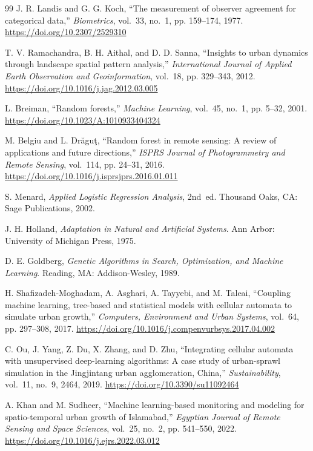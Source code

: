 \documentclass[12pt,a4paper]{article}
\begin{document}
\begin{thebibliography}{99}
J. R. Landis and G. G. Koch, ``The measurement of observer agreement for categorical data,'' \textit{Biometrics}, vol.~33, no.~1, pp. 159--174, 1977.
\url{https://doi.org/10.2307/2529310}

T. V. Ramachandra, B. H. Aithal, and D. D. Sanna, ``Insights to urban dynamics through landscape spatial pattern analysis,'' \textit{International Journal of Applied Earth Observation and Geoinformation}, vol.~18, pp. 329--343, 2012.
\url{https://doi.org/10.1016/j.jag.2012.03.005}

L. Breiman, ``Random forests,'' \textit{Machine Learning}, vol.~45, no.~1, pp. 5--32, 2001.
\url{https://doi.org/10.1023/A:1010933404324}

M. Belgiu and L. Dr\u{a}gu\c{t}, ``Random forest in remote sensing: A review of applications and future directions,'' \textit{ISPRS Journal of Photogrammetry and Remote Sensing}, vol.~114, pp. 24--31, 2016.
\url{https://doi.org/10.1016/j.isprsjprs.2016.01.011}

S. Menard, \textit{Applied Logistic Regression Analysis}, 2nd~ed. Thousand Oaks, CA: Sage Publications, 2002.

J. H. Holland, \textit{Adaptation in Natural and Artificial Systems}. Ann Arbor: University of Michigan Press, 1975.

D. E. Goldberg, \textit{Genetic Algorithms in Search, Optimization, and Machine Learning}. Reading, MA: Addison-Wesley, 1989.

H. Shafizadeh-Moghadam, A. Asghari, A. Tayyebi, and M. Taleai, ``Coupling machine learning, tree-based and statistical models with cellular automata to simulate urban growth,'' \textit{Computers, Environment and Urban Systems}, vol.~64, pp. 297--308, 2017.
\url{https://doi.org/10.1016/j.compenvurbsys.2017.04.002}

C. Ou, J. Yang, Z. Du, X. Zhang, and D. Zhu, ``Integrating cellular automata with unsupervised deep-learning algorithms: A case study of urban-sprawl simulation in the Jingjintang urban agglomeration, China,'' \textit{Sustainability}, vol.~11, no.~9, 2464, 2019.
\url{https://doi.org/10.3390/su11092464}

A. Khan and M. Sudheer, ``Machine learning-based monitoring and modeling for spatio-temporal urban growth of Islamabad,'' \textit{Egyptian Journal of Remote Sensing and Space Sciences}, vol.~25, no.~2, pp. 541--550, 2022.
\url{https://doi.org/10.1016/j.ejrs.2022.03.012}


\end{thebibliography}
\end{document}
